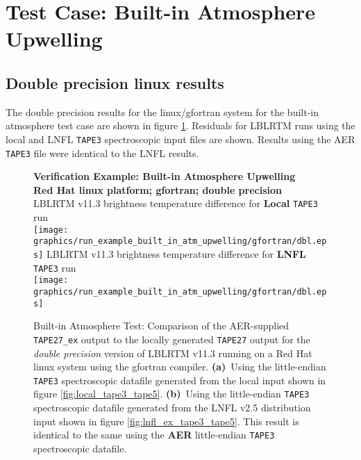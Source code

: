 \section{Test Case: Built-in Atmosphere Upwelling}

\subsection{Double precision linux results}
The double precision results for the linux/gfortran system for the built-in atmosphere test case are shown in figure \ref{fig:run_example_built_in_atm_upwelling-dbl_gfortran}. Residuals for LBLRTM runs using the local and LNFL \texttt{TAPE3} spectroscopic input files are shown. Results using the AER \texttt{TAPE3} file were identical to the LNFL results.

\begin{figure}[htp]
  \centering
  \qquad\sffamily\textbf{Verification Example: Built-in Atmosphere Upwelling}\\
  \qquad\sffamily\textbf{Red Hat linux platform; gfortran; double precision}\\
  \qquad\textsf{LBLRTM v11.3 brightness temperature difference for \textbf{Local} \texttt{TAPE3} run}\\
  \texttt{[image: graphics/run\_example\_built\_in\_atm\_upwelling/gfortran/dbl.eps]}
  \qquad\textsf{LBLRTM v11.3 brightness temperature difference for \textbf{LNFL} \texttt{TAPE3} run}\\
  \texttt{[image: graphics/run\_example\_built\_in\_atm\_upwelling/gfortran/dbl.eps]}
  \caption{Built-in Atmosphere Test: Comparison of the AER-supplied \texttt{TAPE27\_ex} output to the locally generated \texttt{TAPE27} output for the \textsl{double precision} version of LBLRTM v11.3 running on a Red Hat linux system using the gfortran compiler. \mbox{\textbf{(a)} Using} the little-endian \texttt{TAPE3} spectroscopic datafile generated from the local input shown in figure \ref{fig:local_tape3_tape5}. \mbox{\textbf{(b)} Using} the little-endian \texttt{TAPE3} spectroscopic datafile generated from the LNFL v2.5 distribution input shown in figure \ref{fig:lnfl_ex_tape3_tape5}. This result is identical to the same using the \textbf{AER} little-endian \texttt{TAPE3} spectroscopic datafile.}
  \label{fig:run_example_built_in_atm_upwelling-dbl_gfortran}
\end{figure}

